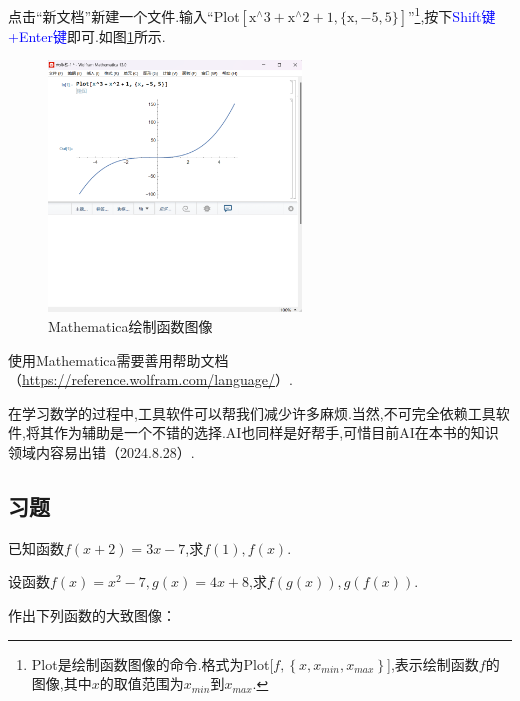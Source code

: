\documentclass[lang=cn,math=cm,chinesefont=nofont,11pt,scheme=chinese,twocol]{elegantbook}
\begin{document}
点击“新文档”新建一个文件.输入“Plot$\left[\text{x}^{\land}3+\text{x}^{\land}2+1,\{\text{x},-5,5\}\right]$”\footnote{Plot是绘制函数图像的命令.格式为Plot[$f,\left\{x,x_{min},x_{max}\right\}$],表示绘制函数$f$的图像,其中$x$的取值范围为$x_{min}$到$x_{max}$.},按下\textcolor{blue}{Shift键+Enter键}即可.如图\ref{img:mathematica2}所示.

\begin{figure}[h]
  \centering
  \includegraphics[width=0.6\textwidth]{image/mathematica2.png}
  \caption{Mathematica绘制函数图像}
  \label{img:mathematica2}
\end{figure}

使用Mathematica需要善用帮助文档（\href{https://reference.wolfram.com/language/}{https://reference.wolfram.com/language/}）.

在学习数学的过程中,工具软件可以帮我们减少许多麻烦.当然,不可完全依赖工具软件,将其作为辅助是一个不错的选择.AI也同样是好帮手,可惜目前AI在本书的知识领域内容易出错（2024.8.28）.

\subsection{习题}

\begin{exercise}\label{2017RJB.P94.8.changed}
  已知函数$f(x+2)=3x-7$,求$f(1),f(x)$.
\end{exercise}

\begin{exercise}
  设函数$f(x)=x^2-7,g(x)=4x+8$,求$f(g(x)),g(f(x))$.
\end{exercise}

\begin{exercise}
  作出下列函数的大致图像：
\end{exercise}
\end{document}
